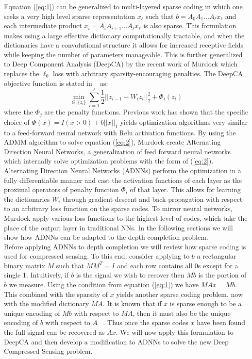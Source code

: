 Equation (\ref{eq:1}) can be generalized to multi-layered sparse coding in which one seeks a very high level sparse representation $x_{\ell}$ such that $b = A_0A_1\ldots A_{\ell}x_{\ell}$ and each intermediate product $x_i = A_iA_{i+1}\ldots A_{\ell}x_{\ell}$ is also sparse. This formulation makes using a large effective dictionary computationally tractable, and when the dictionaries have a convolutional structure it allows for increased receptive fields while keeping the number of parameters manageable. This is further generalized to Deep Component Analysis (DeepCA) by the recent work of Murdock \etal which replaces the $\ell_0$ loss with arbitrary sparsity-encouraging penalties. The DeepCA objective function is stated in ~\cite{} as:
\begin{equation}
  \label{eq:2}
  \min_{\Theta, \{z_i\}} \sum_{i=1}^{\ell} \frac{1}{2} \left|| z_{i-1} - W_iz_i\right||_2^2 + \Phi_i(z_i)
\end{equation}
where the $\Phi_j$ are the penalty functions. Previous work has shown that the specific choice of $\Phi(x) = I(x > 0) + b\left||x\right||_1$ yields optimization algorithms very similar to a feed-forward neural network with Relu activation functions. By using the ADMM algorithm to solve equation (\ref{eq:2}), Murdock \etal create Alternating Direction Neural Networks, a generalization of feed forward neural networks which internally solve optimization problems with the form of (\ref{eq:2}). Alternating Direction Neural Networks (ADNNs) perform the optimization in a fully differentiable manner and cast the activation functions of each layer as the proximal operators of penalty function $\Phi_i$ of that layer. This allows for learning the dictionaries $W_i$ through gradient descent and back propagation with respect to an arbitrary loss function on the sparse codes. To mirror neural networks, Murdock \etal apply various loss functions to the highest level of codes, which take the place of the output layer in traditional NNs. In the following sections we will show how ADNNs can be adapted to the depth completion problem.\\

Before applying ADNNs to depth completion we will review how sparse coding is used for compressed sensing. To this end, consider applying to $b$ a rectangular binary matrix $M$ such that $MM^T = I$ and each row contains all 0s except for a single 1. Intuitively, if $b$ is the signal we wish to recover then $Mb$ is the portion of $b$ we measure. Using the condition from equation (\ref{eq:1}) we have $MAx = Mb$. This combined with the sparsity of $x$ yields another sparse coding problem, now with the modified dictionary $MA$. It is known that if $x$ is sparse enough to be a unique encoding of $Mb$ with respect to $MA$, then it must also be the unique encoding of $b$ with respect to $A$ ~\cite{}. Thus once the sparse codes $x$ have been found the full signal can be recovered as $Ax$. We will now apply this formulation to DeepCA and then develop a modification to ADNNs to solve the new Deep Compressed Sensing problem.

